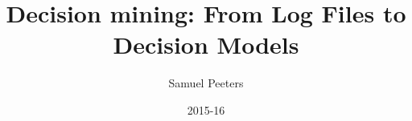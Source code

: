 \documentclass[11pt,a4paper,twoside]{book}
\begin{document}
\title{Decision mining: From Log Files to Decision Models}
\author{Samuel Peeters}
\date{2015-16}
\maketitle	

	\frontmatter
		
		\tableofcontents
		
		
		
	\mainmatter
		
		
	\backmatter
\end{document}
